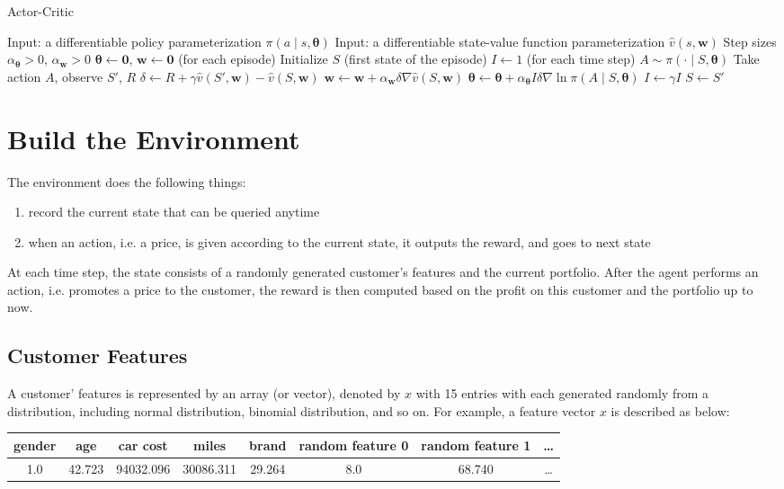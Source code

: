 \documentclass[11pt]{article}
\begin{document}
\begin{algorithm}
\caption{Actor-Critic}
\begin{algorithmic}[1]
\State Input: a differentiable policy parameterization 
\(\pi\left(a\middle|s, \bm{\theta}\right)\)
\State Input: a differentiable state-value function parameterization
\(\hat{v}(s,\bm{w})\)
\State Step sizes \(\alpha_{\bm{\theta}}>0\), \(\alpha_{\bm{w}}>0\)
\State \(\bm{\theta} \gets \bm{0}\), \(\bm{w} \gets \bm{0}\)
\Loop \hspace{0.3mm} (for each episode)
    \State Initialize \(S\) (first state of the episode)
    \State \(I \gets 1\)
    \Loop \hspace{0.3mm} (for each time step)
        \State \(A\sim\pi\left(\cdot\middle|S, \bm{\theta}\right)\)
        \State Take action \(A\), observe \(S'\), \(R\)
        \State \(\delta \gets R + \gamma\hat{v}(S',\bm{w})-\hat{v}(S,\bm{w})\)
        \State \(\bm{w} \gets \bm{w} + 
        \alpha_{\bm{w}} \delta\nabla\hat{v}(S,\bm{w})\)
        \State \(\bm{\theta} \gets \bm{\theta} + \alpha_{\bm{\theta}}I\delta
        \nabla\ln{\pi\left(A\middle|S, \bm{\theta}\right)}\)
        \State \(I \gets \gamma I\)
        \State \(S \gets S'\)
    \EndLoop
\EndLoop
\end{algorithmic}
\end{algorithm}

\section{Build the Environment}
The environment does the following things:
\begin{enumerate}
    \item record the current state that can be queried anytime
    \item when an action, i.e. a price, is given according to the current 
        state, it outputs the reward, and goes to next state
\end{enumerate}
At each time step, the state consists of a randomly generated customer's 
features and the current portfolio. After the agent performs an action, i.e.
promotes a price to the customer, the reward is then computed based on the 
profit on this customer and the portfolio up to now.

\subsection{Customer Features}
A customer' features is represented by an array (or vector), denoted by \(x\) 
with 15 entries with each generated randomly from a distribution, 
including normal distribution, binomial distribution, and so on. For example, 
a feature vector \(x\) is described as below:
\begin{table}[htpb]
    \centering
    \begin{tabular}{c|c|c|c|c|c|c|c}
        gender & age & car cost & miles & brand & random feature 0 & random 
        feature 1 & \dots\\
        \hline
        1.0 & 42.723 & 94032.096 & 30086.311 & 29.264 & 8.0 & 68.740 & \dots
    \end{tabular}
\end{table}
\end{document}
